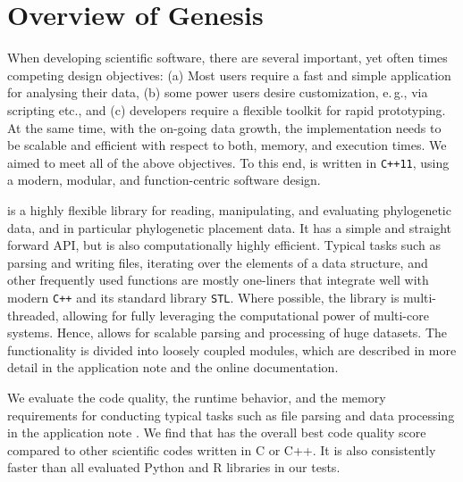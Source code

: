 
\section{Overview of Genesis}
\label{ch:PipelineImplementation:sub:Genesis}


When developing scientific software, there are several important, yet often times competing design objectives:
(a) Most users require a fast and simple application for analysing their data,
(b) some power users desire customization, e.\,g., via scripting etc., and
(c) developers require a flexible toolkit for rapid prototyping.
At the same time, with the on-going data growth,
the implementation needs to be scalable and efficient with respect to both, memory, and execution times.
We aimed to meet all of the above objectives.
To this end,  is written in \texttt{C++11}, using a modern, modular, and function-centric software design.

 is a highly flexible library for reading, manipulating, and evaluating phylogenetic data,
and in particular phylogenetic placement data.
It has a simple and straight forward API, but is also computationally highly efficient.
Typical tasks such as parsing and writing files, iterating over the elements of a data structure,
and other frequently used functions are mostly one-liners
that integrate well with modern \texttt{C++} and its standard library \texttt{STL}.
Where possible, the library is multi-threaded,
allowing for fully leveraging the computational power of multi-core systems.
Hence,  allows for scalable parsing and processing of huge datasets.
The functionality is divided into loosely coupled modules,
which are described in more detail in the application note \cite{Czech2019-genesis-gappa} and the online documentation.

We evaluate the code quality, the runtime behavior, and the memory requirements
for conducting typical tasks such as file parsing and data processing in the application note \cite{Czech2019-genesis-gappa}.
We find that  has the overall best code quality score compared to other scientific codes written in C or C++.
It is also consistently faster than all evaluated Python and R libraries in our tests.

